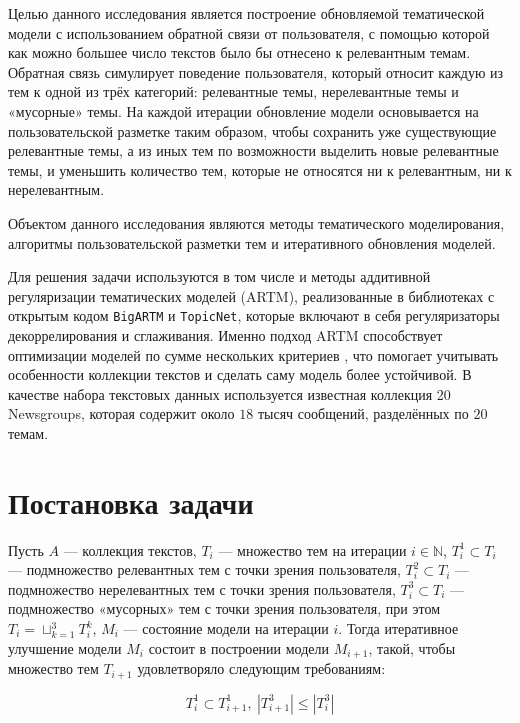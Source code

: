 \documentclass{article}
\begin{document}
Целью данного исследования является построение обновляемой тематической модели с использованием обратной связи от пользователя, с помощью которой как можно большее число текстов было бы отнесено к релевантным темам. Обратная связь симулирует поведение пользователя, который относит каждую из тем к одной из трёх категорий: релевантные темы, нерелевантные темы и «мусорные» темы. На каждой итерации обновление модели основывается на пользовательской разметке таким образом, чтобы сохранить уже существующие релевантные темы, а из иных тем по возможности выделить новые релевантные темы, и уменьшить количество тем, которые не относятся ни к релевантным, ни к нерелевантным.

Объектом данного исследования являются методы тематического моделирования, алгоритмы пользовательской разметки тем и итеративного обновления моделей.

Для решения задачи используются в том числе и методы аддитивной регуляризации тематических моделей (ARTM), реализованные в библиотеках с открытым кодом \texttt{BigARTM} и \texttt{TopicNet}, которые включают в себя регуляризаторы декоррелирования и сглаживания. Именно подход ARTM способствует оптимизации моделей по сумме нескольких критериев \citep{artm}, что помогает учитывать особенности коллекции текстов и сделать саму модель более устойчивой. В качестве набора текстовых данных используется известная коллекция 20 Newsgroups, которая содержит около $18$ тысяч сообщений, разделённых по $20$ темам.

\section{Постановка задачи}


Пусть $A$ — коллекция текстов, $T_i$ — множество тем на итерации $i \in \mathbb{N}$, $T_i^1 \subset T_i$ — подмножество релевантных тем с точки зрения пользователя, $T_i^2 \subset T_i$ — подмножество нерелевантных тем с точки зрения пользователя, $T_i^3 \subset T_i$ — подмножество «мусорных» тем с точки зрения пользователя, при этом $T_i = \sqcup_{k = 1}^3 T_i^k$, $M_i$ — состояние модели на итерации $i$. Тогда итеративное улучшение модели $M_i$ состоит в построении модели $M_{i + 1}$, такой, чтобы множество тем $T_{i + 1}$ удовлетворяло следующим требованиям:

$$T_i^1 \subset T_{i + 1}^1, \ \left| T_{i + 1}^3 \right| \leq \left| T_i^3 \right|$$
\end{document}
